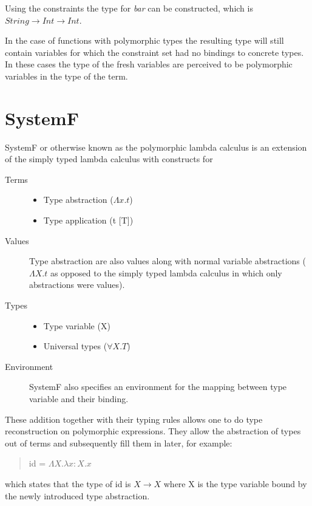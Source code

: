 Using the constraints {} the type for \emph{bar} can be constructed, which is $String \rightarrow Int \rightarrow Int$.

In the case of functions with polymorphic types the resulting type will still contain variables for which the constraint set had no bindings to concrete types. In these cases the type of the fresh variables are perceived to be polymorphic variables in the type of the term.

\section{SystemF}
SystemF or otherwise known as the polymorphic lambda calculus is an extension of the simply typed lambda calculus with constructs for

\begin{description}
\item[Terms]{
	\begin{minipage}[t]{\linewidth}
		\begin{itemize}
			\item Type abstraction ($\Lambda x.t$)
			\item Type application (t [T])
		\end{itemize}
	\end{minipage}
}
\item[Values] Type abstraction are also values along with normal variable abstractions ($\Lambda X.t$ as opposed to the simply typed lambda calculus in which only abstractions were values).
\item[Types]{ 
	\begin{minipage}[t]{\linewidth}
		\begin{itemize}
			\item Type variable (X)
			\item Universal types ($\forall X. T$)
		\end{itemize}
	\end{minipage}
}
\item[Environment] SystemF also specifies an environment for the mapping between type variable and their binding.
\end{description}

These addition together with their typing rules allows one to do type reconstruction on polymorphic expressions. They allow the abstraction of types out of terms and subsequently fill them in later, for example:
\begin{quotation}
id = $\Lambda X.\lambda x:X. x$
\end{quotation}
which states that the type of id is $X \rightarrow X$ where X is the type variable bound by the newly introduced type abstraction. 

